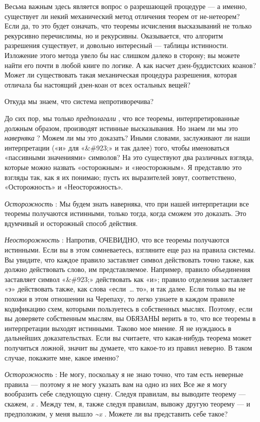 Весьма важным здесь является вопрос о разрешающей процедуре --- а именно, существует ли некий механический метод отличения теорем от не-нетеорем? Если да, то это будет означать, что теоремы исчисления высказываний не только рекурсивно перечислимы, но и рекурсивны. Оказывается, что алгоритм разрешения существует, и довольно интересный --- таблицы истинности. Изложение этого метода увело бы нас слишком далеко в сторону; вы можете найти его почти в любой книге по логике. А как насчет дзен-буддистских коанов? Может ли существовать такая механическая процедура разрешения, которая отличала бы настоящий дзен-коан от всех остальных вещей?

Откуда мы знаем, что система непротиворечива?

До сих пор, мы только \emph{предполагали} , что все теоремы, интерпретированные должным образом, производят истинные высказывания. Но знаем ли мы это \emph{наверняка} ? Можем ли мы это доказать? Иными словами, заслуживают ли наши интерпретации («и» для «\&\#923;» и так далее) того, чтобы именоваться «пассивными значениями» символов? На это существуют два различных взгляда, которые можно назвать «осторожным» и «неосторожным». Я представлю это взгляды так, как я их понимаю; пусть их выразителей зовут, соответствено, «Осторожность» и «Неосторожность».

\emph{Осторожность} : Мы будем знать наверняка, что при нашей интерпретации все теоремы получаются истинными, только тогда, когда сможем это доказать. Это вдумчивый и осторожный способ действия.

\emph{Неосторожность} : Напротив, ОЧЕВИДНО, что все теоремы получаются истинными. Если вы в этом сомневаетесь, взгляните еще раз на правила системы. Вы увидите, что каждое правило заставляет символ действовать точно также, как должно действовать слово, им представляемое. Например, правило объединения заставляет символ «\&\#923;» действовать как «и»; правило отделения заставляет «э» действовать также, как слова «если~\ldots{} то», и так далее. Если только вы не похожи в этом отношении на Черепаху, то легко узнаете в каждом правиле кодификацию схем, которыми пользуетесь в собственных мыслях. Поэтому, если вы доверяете собственным мыслям, вы ОБЯЗАНЫ верить в то, что все теоремы в интерпретации выходят истинными. Таково мое мнение. Я не нуждаюсь в дальнейших доказательствах. Если вы считаете, что какая-нибудь теорема может получиться ложной, значит вы думаете, что какое-то из правил неверно. В таком случае, покажите мне, какое именно?

\emph{Осторожность} : Не могу, поскольку я не знаю точно, что там есть неверные правила --- поэтому я не могу указать вам на одно из них Все же я могу вообразить себе следующую сцену. Следуя правилам, вы выводите теорему --- скажем, \emph{x} . Между тем, я, также следуя правилам, вывожу другую теорему --- и предположим, у меня вышло \emph{\textasciitilde x} . Можете ли вы представить себе такое?

